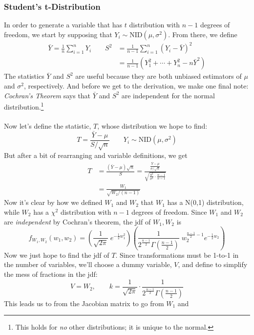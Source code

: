 \documentclass[a4paper,12pt]{scrartcl}
\begin{document}
\subsubsection{Student's t-Distribution}

In order to generate a variable that has $t$ distribution with 
$n-1$ degrees of freedom,
we start by supposing that $Y_i\sim \text{NID}(\mu,\sigma^2)$. From
there, we define
\begin{align*}
   \bar{Y} = \frac{1}{n} \sum^n_{i=1} Y_i \qquad 
   S^2 &= \frac{1}{n-1} \sum^n_{i=1} (Y_i - \bar{Y})^2 \\
   &=\frac{1}{n-1} \left( Y_1^2 + \cdots + Y_n^2 - n \bar{Y}^2\right)
\end{align*}
The statistics $\bar{Y}$ and $S^2$ are useful because they are both
unbiased estimators of $\mu$ and $\sigma^2$, respectively. 
And before we get to the derivation, we make one final note: 
\emph{Cochran's Theorem}
says that $\bar{Y}$ and $S^2$ are independent for the normal 
distribution.\footnote{This holds for \emph{no} other distributions;
it is unique to the normal.} 
\\
\\
Now let's define the statistic, $T$,
whose distribution we hope to find:
   \[ T = \frac{\bar{Y}-\mu}{S/\sqrt{n}} \qquad Y_i \sim \text{NID}(\mu,
      \sigma^2) \]
But after a bit of rearranging and variable definitions, we get
\begin{align*}
   T &= \frac{(\bar{Y}-\mu)\sqrt{n} }{S} = \frac{
      \frac{\bar{Y}-\mu}{\sigma/\sqrt{n}}}{\sqrt{\frac{S^2}{\sigma^2}
      \cdot \frac{n-1}{n-1}}} \\
      &= \frac{W_1}{\sqrt{W_2 / (n-1)}}
\end{align*}
Now it's clear by how we defined $W_1$ and $W_2$ that $W_1$ has a
N(0,1) distribution, while $W_2$ has a $\chi^2$ distribution with
$n-1$ degrees of freedom. Since $W_1$ and $W_2$ are \emph{independent}
by Cochran's theorem, the jdf of $W_1, W_2$ is 
   \[ f_{W_1, W_2}(w_1, w_2) = \left(
      \frac{1}{\sqrt{2\pi}} \; e^{-\frac{1}{2} w_1^2}\right)\left( 
      \frac{1}{ 2^{\frac{n-1}{2}} \Gamma\left(\frac{n-1}{2}\right)}
      \; w_2^{\frac{n-1}{2} -1} e^{-\frac{1}{2}
      w_2}\right)
      \]
Now we just hope to find the jdf of $T$. Since transformations must be
1-to-1 in the number of variables, we'll choose
a dummy variable, $V$, and define to simplify the mess of fractions
in the jdf:
\[ V =W_2, \qquad k = \frac{1}{\sqrt{2\pi}} \cdot \frac{1}{
   2^{\frac{n-1}{2}} \Gamma\left(\frac{n-1}{2}\right)} \]
This leads us to from the Jacobian matrix to go from $W_1$ and
\end{document}
